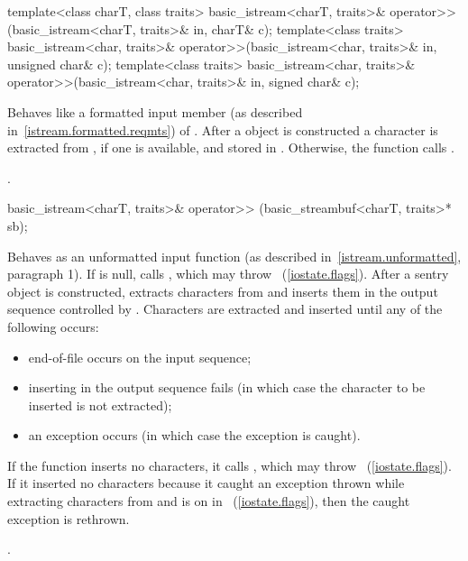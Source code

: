 %
\begin{itemdecl}
template<class charT, class traits>
  basic_istream<charT, traits>& operator>>(basic_istream<charT, traits>& in,
                                           charT& c);
template<class traits>
  basic_istream<char, traits>& operator>>(basic_istream<char, traits>& in,
                                          unsigned char& c);
template<class traits>
  basic_istream<char, traits>& operator>>(basic_istream<char, traits>& in,
                                          signed char& c);
\end{itemdecl}

\begin{itemdescr}
\pnum
\effects
Behaves like a formatted input member (as described in~\ref{istream.formatted.reqmts})
of .
After a
object is constructed
a character is extracted from , if one is available, and stored in .
Otherwise, the function calls
.

\pnum
\returns
{}.
\end{itemdescr}

%
\begin{itemdecl}
basic_istream<charT, traits>& operator>>
  (basic_streambuf<charT, traits>* sb);
\end{itemdecl}

\begin{itemdescr}
\pnum
\effects
Behaves as an unformatted input function (as described
in~\ref{istream.unformatted}, paragraph 1).
If  is null, calls
,
which may throw
~(\ref{iostate.flags}).
After a sentry object is constructed, extracts
characters from
and inserts them in the output sequence controlled by .
Characters are extracted and inserted until any of the following occurs:
\begin{itemize}
\item
end-of-file occurs on the input sequence;
\item
inserting in the output sequence fails
(in which case the character to be inserted is not extracted);
\item
an exception occurs (in which case the exception is caught).
\end{itemize}

\pnum
If the function inserts no characters, it calls
,
which may throw
~(\ref{iostate.flags}).
If it inserted no characters because it caught
an exception thrown while extracting characters from
and
is on in
~(\ref{iostate.flags}),
then the caught exception is rethrown.

\pnum
\returns
{}.
\end{itemdescr}

